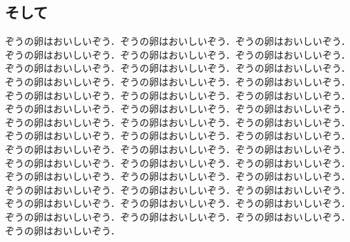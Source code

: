 \documentclass[
	10pt,
	a4j,		%
	twocolumn,	%
	uplatex
]{jsarticle}
\begin{document}
\subsection{そして}
ぞうの卵はおいしいぞう．ぞうの卵はおいしいぞう．ぞうの卵はおいしいぞう．ぞうの卵はおいしいぞう．ぞうの卵はおいしいぞう．ぞうの卵はおいしいぞう．ぞうの卵はおいしいぞう．ぞうの卵はおいしいぞう．ぞうの卵はおいしいぞう．ぞうの卵はおいしいぞう．ぞうの卵はおいしいぞう．ぞうの卵はおいしいぞう．ぞうの卵はおいしいぞう．ぞうの卵はおいしいぞう．ぞうの卵はおいしいぞう．ぞうの卵はおいしいぞう．ぞうの卵はおいしいぞう．ぞうの卵はおいしいぞう．ぞうの卵はおいしいぞう．ぞうの卵はおいしいぞう．ぞうの卵はおいしいぞう．ぞうの卵はおいしいぞう．ぞうの卵はおいしいぞう．ぞうの卵はおいしいぞう．ぞうの卵はおいしいぞう．ぞうの卵はおいしいぞう．ぞうの卵はおいしいぞう．ぞうの卵はおいしいぞう．ぞうの卵はおいしいぞう．ぞうの卵はおいしいぞう．ぞうの卵はおいしいぞう．ぞうの卵はおいしいぞう．ぞうの卵はおいしいぞう．ぞうの卵はおいしいぞう．ぞうの卵はおいしいぞう．ぞうの卵はおいしいぞう．ぞうの卵はおいしいぞう．ぞうの卵はおいしいぞう．ぞうの卵はおいしいぞう．ぞうの卵はおいしいぞう．ぞうの卵はおいしいぞう．ぞうの卵はおいしいぞう．ぞうの卵はおいしいぞう\cite{110001167075,120002205324,mr1763essay,fisher1925statistical}．
\end{document}
